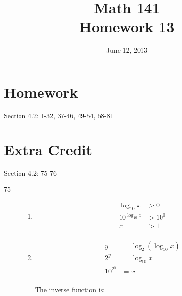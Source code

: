 \documentclass{exam}
\date{June 12, 2013}
\author{}
\title{Math 141 \\ Homework 13}
\begin{document}
  \maketitle

  \section{Homework}

  Section 4.2: 1-32, 37-46, 49-54, 58-81

 \section{Extra Credit}
  Section 4.2: 75-76

  \ifprintanswers
    \begin{description}
      \item[75]
        \begin{enumerate}[a]

          \item 
            \begin{align*}
              \log_{10} x      & > 0 \\
              10^{\log_{10} x} & > 10^0 \\
              x                & > 1 \\
            \end{align*}


          \item 
            \begin{align*}
              y        &= \log_2 (\log_{10} x) \\
              2^y      &= \log_{10} x \\
              10^{2^y} &= x \\
            \end{align*}

            The inverse function is: 



\end{enumerate}
\end{description}
\end{document}
